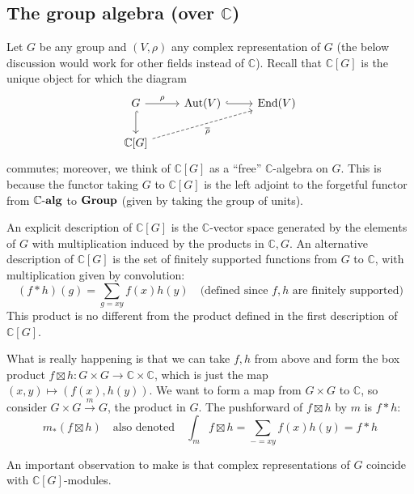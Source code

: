 \documentclass[11pt,leqno]{article}
\theoremstyle{plain}
\theoremstyle{definition}
\numberwithin{equation}{section}
\numberwithin{lem}{section}
\DeclareMathOperator{\Aut}{Aut}
\DeclareMathOperator{\End}{End}
\newcommand{\catname}[1]{{\normalfont\mathbf{#1}}}
\newcommand{\alg}{\text{-}\catname{alg}}
\newcommand{\Group}{\catname{Group}}
\begin{document}
\subsection{The group algebra (over $\mathbb C$)}
Let $G$ be any group and $(V,\rho)$ any complex representation of $G$ (the below discussion would work for other fields instead of $\mathbb C$). Recall that $\mathbb C[G]$ is the unique object for which the diagram 
\[\begin{tikzcd}[ampersand replacement=\&]
	G \& {\Aut(V)} \& {\End(V)} \\
	{\mathbb C[G]}
	\arrow["\rho", from=1-1, to=1-2]
	\arrow[hook, from=1-1, to=2-1]
	\arrow[hook, from=1-2, to=1-3]
	\arrow["{\overline\rho}"', dashed, from=2-1, to=1-3]
\end{tikzcd}\]
commutes; moreover, we think of $\mathbb C[G]$ as a ``free'' $\mathbb C$-algebra on $G$. This is because the functor taking $G$ to $\mathbb C[G]$ is the left adjoint to the forgetful functor from $\mathbb C\alg$ to $\Group$ (given by taking the group of units).

An explicit description of $\mathbb C[G]$ is the $\mathbb C$-vector space generated by the elements of $G$ with multiplication induced by the products in $\mathbb C, G$. An alternative description of $\mathbb C[G]$ is the set of finitely supported functions from $G$ to $\mathbb C$, with multiplication given by convolution:
\[(f\ast h)(g) = \sum_{g = xy}f(x)h(y)\quad\text{(defined since $f,h$ are finitely supported)}\]
This product is no different from the product defined in the first description of $\mathbb C[G]$.

What is really happening is that we can take $f,h$ from above and form the box product $f\boxtimes h\colon G\times G \to \mathbb C\times\mathbb C$, which is just the map $(x,y)\mapsto (f(x),h(y))$. We want to form a map from $G\times G$ to $\mathbb C$, so consider $G\times G\xrightarrow{m}G$, the product in $G$. The pushforward of $f\boxtimes h$ by $m$ is $f\ast h$:
\[m_\ast(f\boxtimes h) \quad\text{also denoted}\quad \int_mf\boxtimes h = \sum_{- = xy}f(x)h(y) = f\ast h\]

An important observation to make is that complex representations of $G$ coincide with $\mathbb C[G]$-modules. 
\end{document}
